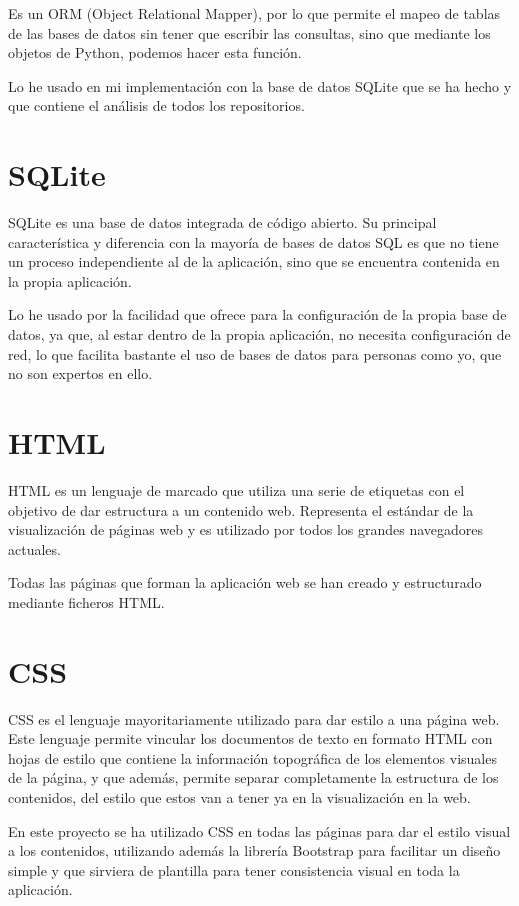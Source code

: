 \documentclass[a4paper, 12pt]{book}
\begin{document}
Es un ORM (Object Relational Mapper), por lo que permite el mapeo de tablas de las bases de datos sin tener que escribir las consultas, sino que mediante los objetos de Python, podemos hacer esta función.

Lo he usado en mi implementación con la base de datos SQLite que se ha hecho y que contiene el análisis de todos los repositorios.

\section{SQLite}
\label{sec:SQLite}

SQLite es una base de datos integrada de código abierto. Su principal característica y diferencia con la mayoría de bases de datos SQL es que no tiene un proceso independiente al de la aplicación, sino que se encuentra contenida en la propia aplicación.

Lo he usado por la facilidad que ofrece para la configuración de la propia base de datos, ya que, al estar dentro de la propia aplicación, no necesita configuración de red, lo que facilita bastante el uso de bases de datos para personas como yo, que no son expertos en ello.

\section{HTML}
\label{sec:HTML}

HTML es un lenguaje de marcado que utiliza una serie de etiquetas con el objetivo de dar estructura a un contenido web. Representa el estándar de la visualización de páginas web y es utilizado por todos los grandes navegadores actuales.

Todas las páginas que forman la aplicación web se han creado y estructurado mediante ficheros HTML.

\section{CSS}
\label{sec:CSS}

CSS es el lenguaje mayoritariamente utilizado para dar estilo a una página web. Este lenguaje permite vincular los documentos de texto en formato HTML con hojas de estilo que contiene la información topográfica de los elementos visuales de la página, y que además, permite separar completamente la estructura de los contenidos, del estilo que estos van a tener ya en la visualización en la web.

En este proyecto se ha utilizado CSS en todas las páginas para dar el estilo visual a los contenidos, utilizando además la librería Bootstrap para facilitar un diseño simple y que sirviera de plantilla para tener consistencia visual en toda la aplicación.
\end{document}
